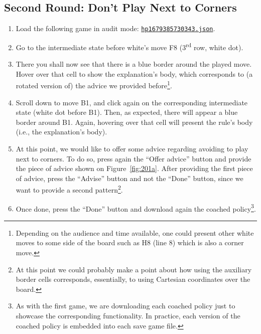 \documentclass[a4paper,11pt]{article}
\theoremstyle{definition}
\theoremstyle{remark}
\numberwithin{equation}{section}
\begin{document}
	\subsection{Second Round: Don't Play Next to Corners}\label{subsec:Round Two}
	\begin{enumerate}
		\item Load the following game in audit mode: \href{../games/hp_48_16_1679385730343.json}{\texttt{hp\textunderscore 1679385730343.json}}.
		\item Go to the intermediate state before white's move F8 (3\textsuperscript{rd} row, white dot).
		\item There you shall now see that there is a blue border around the played move. Hover over that cell to show the explanation's body, which corresponds to (a rotated version of) the advice we provided before\footnote{Depending on the audience and time available, one could present other white moves to some side of the board such as H8 (line 8) which is also a corner move.}.
		\item Scroll down to move B1, and click again on the corresponding intermediate state (white dot before B1). Then, as expected, there will appear a blue border around B1. Again, hovering over that cell will present the rule's body (i.e., the explanation's body).
		\item At this point, we would like to offer some advice regarding avoiding to play next to corners. To do so, press again the ``Offer advice'' button and provide the piece of advice shown on Figure~\ref{fig:201a}. After providing the first piece of advice, press the ``Advise'' button and not the ``Done'' button, since we want to provide a second pattern\footnote{At this point we could probably make a point about how using the auxiliary border cells corresponds, essentially, to using Cartesian coordinates over the board.}.
		\item Once done, press the ``Done'' button and download again the coached policy\footnote{As with the first game, we are downloading each coached policy just to showcase the corresponding functionality. In practice, each version of the coached policy is embedded into each save game file.}.
	\end{enumerate}
\end{document}
